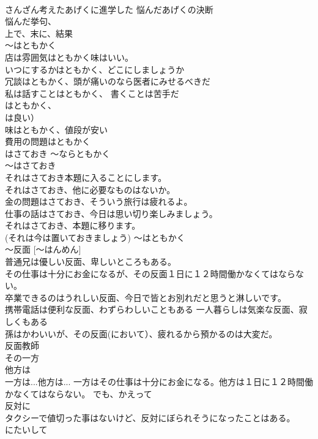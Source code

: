 \documentclass[8pt]{extreport}
\begin{document}
\begin{CJK}{UTF8}{min}
\\	さんざん考えたあげくに進学した 悩んだあげくの決断	
\\	悩んだ挙句、
\\	上で、末に、結果
\\	～はともかく	
\\	店は雰囲気はともかく味はいい。 
\\	いつにするかはともかく、どこにしましょうか 
\\	冗談はともかく、頭が痛いのなら医者にみせるべきだ 
\\	私は話すことはともかく、 書くことは苦手だ 
\\	はともかく、
\\	は良い） 
\\	味はともかく、値段が安い 
\\	費用の問題はともかく 
\\	はさておき ～ならともかく
\\	～はさておき	
\\	それはさておき本題に入ることにします。 
\\	それはさておき、他に必要なものはないか。 
\\	金の問題はさておき、そういう旅行は疲れるよ。 
\\	仕事の話はさておき、今日は思い切り楽しみましょう。 
\\	それはさておき、本題に移ります。 
\\	(それは今は置いておきましょう)		～はともかく
\\	～反面 [～はんめん]	
\\	普通兄は優しい反面、卑しいところもある。 
\\	その仕事は十分にお金になるが、その反面１日に１２時間働かなくてはならない。 
\\	卒業できるのはうれしい反面、今日で皆とお別れだと思うと淋しいです。 
\\	携帯電話は便利な反面、わずらわしいこともある 一人暮らしは気楽な反面、寂しくもある 
\\	孫はかわいいが、その反面(において）、疲れるから預かるのは大変だ。 
\\	反面教師 
\\	その一方 
\\	他方は
\\	一方は...他方は... 一方はその仕事は十分にお金になる。他方は１日に１２時間働かなくてはならない。 でも、かえって 
\\	反対に 
\\	タクシーで値切った事はないけど、反対にぼられそうになったことはある。
\\	にたいして 

\end{CJK}
\end{document}
